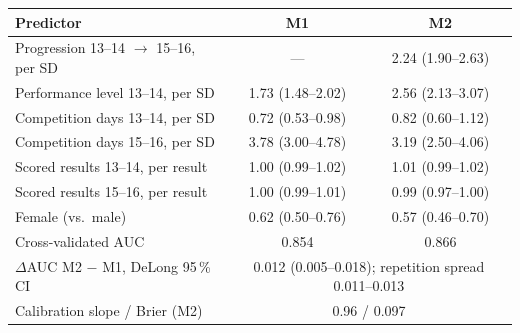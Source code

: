 \begin{tabular}{lcc}
\toprule
Predictor & M1 & M2 \\
\midrule
Progression 13--14 $\to$ 15--16, per SD & --- & 2.24 (1.90--2.63) \\
Performance level 13--14, per SD & 1.73 (1.48--2.02) & 2.56 (2.13--3.07) \\
Competition days 13--14, per SD & 0.72 (0.53--0.98) & 0.82 (0.60--1.12) \\
Competition days 15--16, per SD & 3.78 (3.00--4.78) & 3.19 (2.50--4.06) \\
Scored results 13--14, per result & 1.00 (0.99--1.02) & 1.01 (0.99--1.02) \\
Scored results 15--16, per result & 1.00 (0.99--1.01) & 0.99 (0.97--1.00) \\
Female (vs.\ male) & 0.62 (0.50--0.76) & 0.57 (0.46--0.70) \\
\midrule
Cross-validated AUC & 0.854 & 0.866 \\
$\Delta$AUC M2 $-$ M1, DeLong 95\,\% CI & \multicolumn{2}{c}{0.012 (0.005--0.018); repetition spread 0.011--0.013} \\
Calibration slope / Brier (M2) & \multicolumn{2}{c}{0.96 / 0.097} \\
\bottomrule
\end{tabular}
